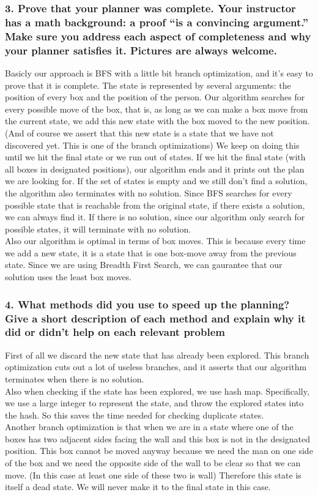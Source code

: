 \documentclass[10pt, letter]{article}
\begin{document}
\subsubsection*{3. Prove that your planner was complete. Your instructor has a math background: a proof ``is
a convincing argument.'' Make sure you address each aspect of completeness and why your
planner satisfies it. Pictures are always welcome.}
Basicly our approach is BFS with a little bit branch optimization, and it's easy to prove that it is complete.
The state is represented by several arguments: the position of every box and the position of the person.
Our algorithm searches for every possible move of the box, that is, as long as we can make a box move from the current state, we add this new state with the box moved to the new position. 
(And of course we assert that this new state is a state that we have not discovered yet. This is one of the branch optimizations)
We keep on doing this until we hit the final state or we run out of states.
If we hit the final state (with all boxes in designated positions), our algorithm ends and it prints out the plan we are looking for.
If the set of states is empty and we still don't find a solution, the algorithm also terminates with no solution.
Since BFS searches for every possible state that is reachable from the original state, if there exists a solution, we can always find it.
If there is no solution, since our algorithm only search for possible states, it will terminate with no solution.
\\Also our algorithm is optimal in terms of box moves. This is because every time we add a new state, it is a state that is one box-move away from the previous state.
Since we are using Breadth First Search, we can gaurantee that our solution uses the least box moves.

\subsubsection*{4. What methods did you use to speed up the planning? Give a short description of each method
and explain why it did or didn't help on each relevant problem}
First of all we discard the new state that has already been explored.
This branch optimization cuts out a lot of useless branches, and it asserts that our algorithm terminates when there is no solution.
\\Also when checking if the state has been explored, we use hash map. 
Specifically, we use a large integer to represent the state, and throw the explored states into the hash.
So this saves the time needed for checking duplicate states.
\\Another branch optimization is that when we are in a state where one of the boxes has two adjacent sides facing the wall and this box is not in the designated position.
This box cannot be moved anyway because we need the man on one side of the box and we need the opposite side of the wall to be clear so that we can move. (In this case at least one side of these two is wall)
Therefore this state is itself a dead state. 
We will never make it to the final state in this case.
\end{document}
